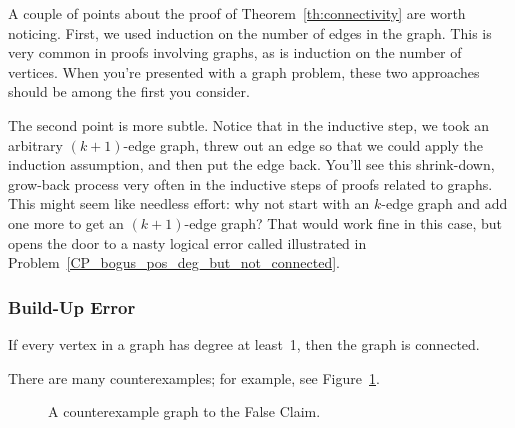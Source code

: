 A couple of points about the proof of Theorem~\ref{th:connectivity}
are worth noticing.  First, we used induction on the number of edges
in the graph.  This is very common in proofs involving graphs, as is
induction on the number of vertices.  When you're presented with a
graph problem, these two approaches should be among the first you
consider.

The second point is more subtle.  Notice that in the inductive step,
we took an arbitrary $(k+1)$-edge graph, threw out an edge so that we
could apply the induction assumption, and then put the edge back.
You'll see this shrink-down, grow-back process very often in the
inductive steps of proofs related to graphs.  This might seem like
needless effort: why not start with an $k$-edge graph and add one more
to get an $(k+1)$-edge graph?  That would work fine in this case, but
opens the door to a nasty logical error called 
illustrated in Problem~\ref{CP_bogus_pos_deg_but_not_connected}.

\iffalse

\subsubsection{Build-Up Error}

\begin{falseclm*}
If every vertex in a graph has degree at least~1, then the graph is
connected.
\end{falseclm*}

There are many counterexamples; for example, see Figure~\ref{fig:5Z}.

\begin{figure}


\caption{A counterexample graph to the False Claim.}

\label{fig:5Z}
\end{figure}


